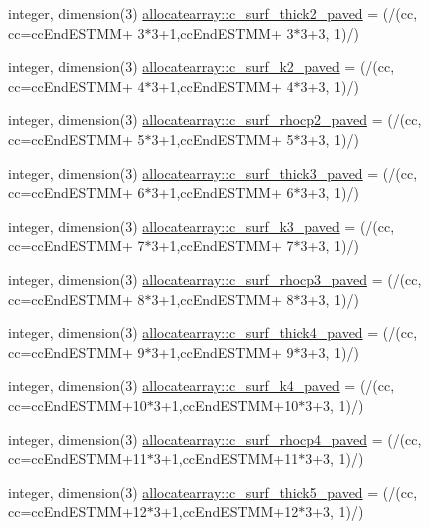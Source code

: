 \begin{DoxyCompactItemize}
\item 
integer, dimension(3) \hyperlink{namespaceallocatearray_ac2c0390dbe3932c5ec8dfd22768a7e13}{allocatearray\+::c\+\_\+surf\+\_\+thick2\+\_\+paved} = (/(cc, cc=cc\+End\+E\+S\+T\+MM+ 3$\ast$3+1,cc\+End\+E\+S\+T\+MM+ 3$\ast$3+3, 1)/)
\item 
integer, dimension(3) \hyperlink{namespaceallocatearray_af9655c312046a7961c47c6ef2b8903b5}{allocatearray\+::c\+\_\+surf\+\_\+k2\+\_\+paved} = (/(cc, cc=cc\+End\+E\+S\+T\+MM+ 4$\ast$3+1,cc\+End\+E\+S\+T\+MM+ 4$\ast$3+3, 1)/)
\item 
integer, dimension(3) \hyperlink{namespaceallocatearray_a20107aaba9ae2f761b47e50002d54c19}{allocatearray\+::c\+\_\+surf\+\_\+rhocp2\+\_\+paved} = (/(cc, cc=cc\+End\+E\+S\+T\+MM+ 5$\ast$3+1,cc\+End\+E\+S\+T\+MM+ 5$\ast$3+3, 1)/)
\item 
integer, dimension(3) \hyperlink{namespaceallocatearray_adc3c9e44723c88e7ec4732af652dd5eb}{allocatearray\+::c\+\_\+surf\+\_\+thick3\+\_\+paved} = (/(cc, cc=cc\+End\+E\+S\+T\+MM+ 6$\ast$3+1,cc\+End\+E\+S\+T\+MM+ 6$\ast$3+3, 1)/)
\item 
integer, dimension(3) \hyperlink{namespaceallocatearray_acf3af91d0a1eb59078343da9f4395d34}{allocatearray\+::c\+\_\+surf\+\_\+k3\+\_\+paved} = (/(cc, cc=cc\+End\+E\+S\+T\+MM+ 7$\ast$3+1,cc\+End\+E\+S\+T\+MM+ 7$\ast$3+3, 1)/)
\item 
integer, dimension(3) \hyperlink{namespaceallocatearray_ac9b0852b6692a5ef0caef755e260fa5a}{allocatearray\+::c\+\_\+surf\+\_\+rhocp3\+\_\+paved} = (/(cc, cc=cc\+End\+E\+S\+T\+MM+ 8$\ast$3+1,cc\+End\+E\+S\+T\+MM+ 8$\ast$3+3, 1)/)
\item 
integer, dimension(3) \hyperlink{namespaceallocatearray_aa58317ae249f058a9b33be35a803a68e}{allocatearray\+::c\+\_\+surf\+\_\+thick4\+\_\+paved} = (/(cc, cc=cc\+End\+E\+S\+T\+MM+ 9$\ast$3+1,cc\+End\+E\+S\+T\+MM+ 9$\ast$3+3, 1)/)
\item 
integer, dimension(3) \hyperlink{namespaceallocatearray_a43ae20538128d75655c3b8dd31374e0c}{allocatearray\+::c\+\_\+surf\+\_\+k4\+\_\+paved} = (/(cc, cc=cc\+End\+E\+S\+T\+MM+10$\ast$3+1,cc\+End\+E\+S\+T\+MM+10$\ast$3+3, 1)/)
\item 
integer, dimension(3) \hyperlink{namespaceallocatearray_a77b35184224cfedd443821142679b770}{allocatearray\+::c\+\_\+surf\+\_\+rhocp4\+\_\+paved} = (/(cc, cc=cc\+End\+E\+S\+T\+MM+11$\ast$3+1,cc\+End\+E\+S\+T\+MM+11$\ast$3+3, 1)/)
\item 
integer, dimension(3) \hyperlink{namespaceallocatearray_ad328a4dec64b7d341695bbd0dec3d28f}{allocatearray\+::c\+\_\+surf\+\_\+thick5\+\_\+paved} = (/(cc, cc=cc\+End\+E\+S\+T\+MM+12$\ast$3+1,cc\+End\+E\+S\+T\+MM+12$\ast$3+3, 1)/)

\end{DoxyCompactItemize}
